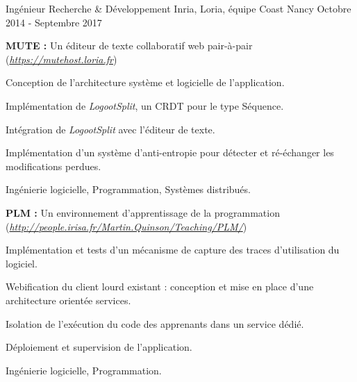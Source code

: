 \begin{cventries}
\cventry
    {Ingénieur Recherche \& Développement} %
    {Inria, Loria, équipe Coast} %
    {Nancy} %
    {Octobre 2014 - Septembre 2017} %
    {}

\vspace{-1.5em}
\begin{cvparagraph}
    \textbf{MUTE :} Un éditeur de texte collaboratif web pair-à-pair (\href{https://mutehost.loria.fr}{\emph{https://mutehost.loria.fr}})

    \medskip
    \begin{cvitems} %
        \item Conception de l'architecture système et logicielle de l'application.
        \item Implémentation de \emph{LogootSplit}, un CRDT pour le type Séquence.
        \item Intégration de \emph{LogootSplit} avec l'éditeur de texte.
        \item Implémentation d'un système d'anti-entropie pour détecter et ré-échanger les modifications perdues.
    \end{cvitems}

    \medskip
     Ingénierie logicielle, Programmation, Systèmes distribués.
\end{cvparagraph}

\begin{cvparagraph}
    \textbf{PLM :} Un environnement d'apprentissage de la programmation (\href{http://people.irisa.fr/Martin.Quinson/Teaching/PLM/}{\emph{http://people.irisa.fr/Martin.Quinson/Teaching/PLM/}})

    \medskip
    \begin{cvitems} %
        \item Implémentation et tests d'un mécanisme de capture des traces d'utilisation du logiciel.
        \item Webification du client lourd existant : conception et mise en place d'une architecture orientée services.
        \item Isolation de l'exécution du code des apprenants dans un service dédié.
        \item Déploiement et supervision de l'application.
    \end{cvitems}

    \medskip
     Ingénierie logicielle, Programmation.
\end{cvparagraph}

\end{cventries}
